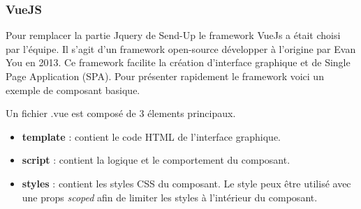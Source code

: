 \subsubsection{VueJS}
Pour remplacer la partie Jquery de Send-Up le framework VueJs a était choisi par l'équipe. Il s'agit d'un framework open-source développer à l'origine par Evan You en 2013. Ce framework facilite la création d'interface graphique et de Single Page Application (SPA). Pour présenter rapidement le framework voici un exemple de composant basique. 


Un fichier .vue est composé de 3 élements principaux.
\begin{itemize}
    \item \textbf{template} : contient le code HTML de l'interface graphique.
    \item \textbf{script} : contient la logique et le comportement du composant. 
    \item \textbf{styles} : contient les styles CSS du composant. Le style peux être utilisé avec une props \textit{scoped} afin de limiter les styles à l'intérieur du composant.
\end{itemize}

